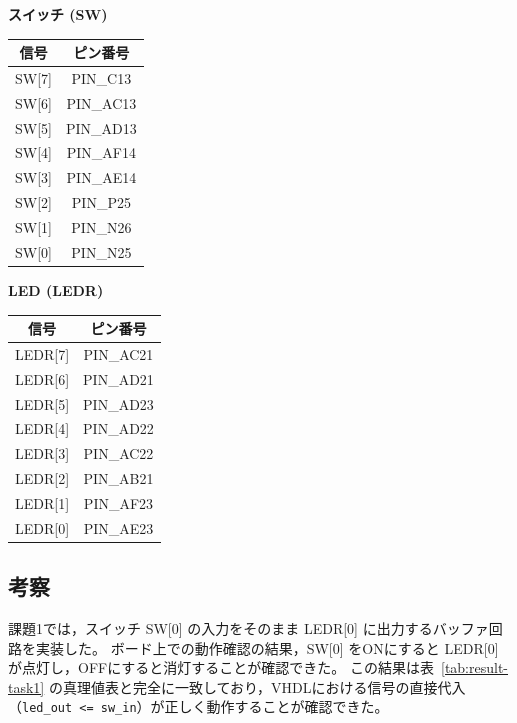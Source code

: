 \documentclass[12pt,a4paper]{ltjsarticle}
\begin{document}
\noindent
\begin{minipage}[t]{0.48\textwidth}
  \centering
  \textbf{スイッチ (SW)}
  \begin{table}[H]
    \centering
    \begin{tabular}{cc}
      \toprule
      \textbf{信号} & \textbf{ピン番号} \\
      \midrule
      SW[7] & PIN\_C13 \\
      SW[6] & PIN\_AC13 \\
      SW[5] & PIN\_AD13 \\
      SW[4] & PIN\_AF14 \\
      SW[3] & PIN\_AE14 \\
      SW[2] & PIN\_P25 \\
      SW[1] & PIN\_N26 \\
      SW[0] & PIN\_N25 \\
      \bottomrule
    \end{tabular}
  \end{table}
\end{minipage}
\hfill
\begin{minipage}[t]{0.48\textwidth}
  \centering
  \textbf{LED (LEDR)}
  \begin{table}[H]
    \centering
    \begin{tabular}{cc}
      \toprule
      \textbf{信号} & \textbf{ピン番号} \\
      \midrule
      LEDR[7]  & PIN\_AC21 \\
      LEDR[6]  & PIN\_AD21 \\
      LEDR[5]  & PIN\_AD23 \\
      LEDR[4]  & PIN\_AD22 \\
      LEDR[3]  & PIN\_AC22 \\
      LEDR[2]  & PIN\_AB21 \\
      LEDR[1]  & PIN\_AF23 \\
      LEDR[0]  & PIN\_AE23 \\
      \bottomrule
    \end{tabular}
  \end{table}
\end{minipage}

\subsection{考察}\label{subsec:discussions}

課題1では，スイッチ SW[0] の入力をそのまま LEDR[0] に出力するバッファ回路を実装した。
ボード上での動作確認の結果，SW[0] をONにすると LEDR[0] が点灯し，OFFにすると消灯することが確認できた。
この結果は表~\ref{tab:result-task1} の真理値表と完全に一致しており，VHDLにおける信号の直接代入（\texttt{led\_out <= sw\_in}）が正しく動作することが確認できた。
\end{document}
